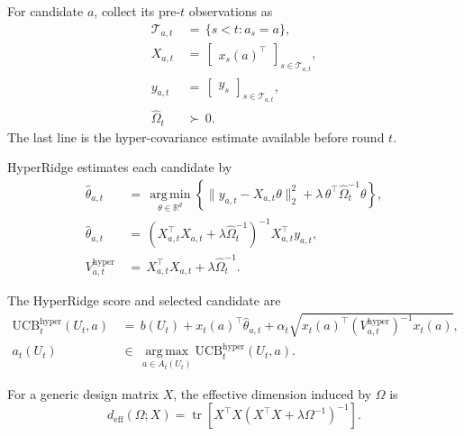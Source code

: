 \documentclass{article} %
\begin{document}
For candidate \(a\), collect its pre-\(t\) observations as
\begin{align}
\mathcal T_{a,t}
&\,=\,
\{s<t:a_s=a\},
\label{eq:hyper-index-set}
\\
X_{a,t}
&\,=\,
\begin{bmatrix}
x_s(a)^\top
\end{bmatrix}_{s\in\mathcal T_{a,t}},
\label{eq:hyper-design-app}
\\
y_{a,t}
&\,=\,
\begin{bmatrix}
y_s
\end{bmatrix}_{s\in\mathcal T_{a,t}},
\label{eq:hyper-response}
\\
\widehat\Omega_t
&\,\succ\,
0.
\label{eq:hyper-omega-hat}
\end{align}
The last line is the hyper-covariance estimate available before round \(t\).

HyperRidge estimates each candidate by
\begin{align}
\widehat{\theta}_{a,t}
&\,=\,
\operatorname*{arg\,min}_{\theta\in\mathbb{R}^d}
\left\{
\|y_{a,t}-X_{a,t}\theta\|_2^2
+
\lambda\,\theta^\top\widehat{\Omega}_t^{-1}\theta
\right\},
\label{eq:hyper-estimator-argmin}
\\
\widehat{\theta}_{a,t}
&\,=\,
\left(
X_{a,t}^\top X_{a,t}
+
\lambda \widehat{\Omega}_t^{-1}
\right)^{-1}
X_{a,t}^\top y_{a,t},
\label{eq:hyper-estimator-closed}
\\
V_{a,t}^{\mathrm{hyper}}
&\,=\,
X_{a,t}^\top X_{a,t}
+
\lambda\widehat{\Omega}_t^{-1}.
\label{eq:hyper-vhat}
\end{align}

The HyperRidge score and selected candidate are
\begin{align}
\mathrm{UCB}_{t}^{\mathrm{hyper}}(U_t,a)
&\,=\,
b(U_t)+x_t(a)^\top \widehat{\theta}_{a,t}
+
\alpha_t
\sqrt{
x_t(a)^\top
\left(V_{a,t}^{\mathrm{hyper}}\right)^{-1}
x_t(a)
},
\label{eq:hyper-ucb-app}
\\
a_t(U_t)
&\,\in\,
\operatorname*{arg\,max}_{a\in A_t(U_t)}
\mathrm{UCB}_{t}^{\mathrm{hyper}}(U_t,a).
\label{eq:hyper-action}
\end{align}

For a generic design matrix \(X\), the effective dimension induced by \(\Omega\) is
\begin{equation}
\label{eq:hyper-deff-app}
d_{\mathrm{eff}}(\Omega;X)
=
\operatorname{tr}
\!\left[
X^\top X
\left(
X^\top X+\lambda\Omega^{-1}
\right)^{-1}
\right].
\end{equation}
\end{document}
